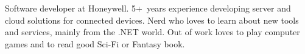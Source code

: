 

\begin{cvparagraph}

Software developer at Honeywell. 5+~years experience developing server and cloud
solutions for connected devices. Nerd who loves to learn about new tools and
services, mainly from the .NET world. Out of work loves to play computer games
and to read good Sci-Fi or Fantasy book.
\end{cvparagraph}
